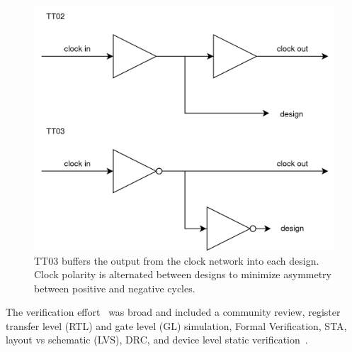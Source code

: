 \begin{figure}[!t]
\centering
\includegraphics[width=\columnwidth]{./Figs/tt02 vs tt03 scanchain clock.png}
\caption{TT03 buffers the output from the clock network into each design. Clock polarity is alternated between designs to minimize asymmetry between positive and negative cycles.}
\label{fig:TT02_vs_TT03}
\end{figure}

The verification effort~\cite{verificationmd} was broad and included a community review, register transfer level (RTL) and gate level (GL) simulation, Formal Verification\cite{sby}, STA, layout vs schematic (LVS), DRC, and device level static verification~\cite{cvc}.
